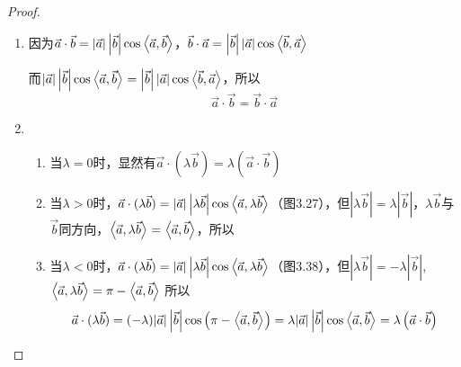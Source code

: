 \begin{proof}
\begin{enumerate}
    \item 因为$\vec{a}\cdot \vec{b}=|\vec{a}|\left|\vec{b}\right|\cos\left\langle \vec{a},\vec{b} \right\rangle$，$\vec{b}\cdot \vec{a}=\left|\vec{b}\right||\vec{a}|\cos\left\langle \vec{b},\vec{a} \right\rangle$

    而$|\vec{a}| \left|\vec{b}\right| \cos \left\langle \vec{a},\vec{b} \right\rangle=\left|\vec{b}\right| |\vec{a}| \cos\left\langle \vec{b},\vec{a} \right\rangle$，所以
\[\vec{a}\cdot \vec{b}=\vec{b}\cdot \vec{a}\]
  \item \begin{enumerate}
      \item 
 当$\lambda =0$时，显然有$\vec{a}\cdot (\lambda \vec{b})=\lambda (\vec{a}\cdot \vec{b})$
  
 \item 当$\lambda >0$时，$\vec{a}\cdot (\lambda \vec{b})=|\vec{a}|\left|\lambda\vec{b}\right|\cos\left\langle \vec{a},\lambda\vec{b} \right\rangle$（图3.27），但$\left|\lambda\vec{b}\right|=\lambda\left|\vec{b}\right|$，$\lambda\vec{b}$与$\vec{b}$同方向，$\left\langle \vec{a},\lambda \vec{b} \right\rangle=\left\langle \vec{a},\vec{b} \right\rangle$，所以

 \item 当$\lambda<0$时，$\vec{a}\cdot (\lambda \vec{b})=|\vec{a}|\left|\lambda\vec{b}\right|\cos\left\langle \vec{a},\lambda\vec{b} \right\rangle$（图3.38），但$\left|\lambda \vec{b}\right|=-\lambda\left|\vec{b}\right|$, $\left\langle \vec{a},\lambda\vec{b} \right\rangle=\pi-\left\langle \vec{a},\vec{b} \right\rangle$
    所以
\[
    \vec{a}\cdot (\lambda \vec{b})= (-\lambda )|\vec{a}|\left|\vec{b}\right|\cos\left(\pi-\left\langle \vec{a},\vec{b} \right\rangle\right)=\lambda|\vec{a}|\left|\vec{b}\right|\cos \left\langle \vec{a},\vec{b} \right\rangle=\lambda\left(\vec{a}\cdot \vec{b}\right)
\]
\end{enumerate} 

\begin{figure}[htp]\centering
    \begin{minipage}[t]{0.48\textwidth}
    \centering
    \caption{}
    \end{minipage}
    \begin{minipage}[t]{0.48\textwidth}
    \centering
\end{minipage}
\end{figure}
\end{enumerate}
\end{proof}
